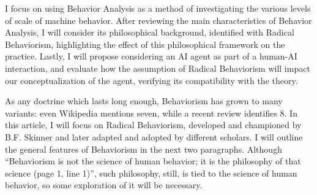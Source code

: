 \documentclass[letterpaper,11pt,twocolumn]{article}
\begin{document}
I focus on using Behavior Analysis as a method of investigating the various levels of scale of machine behavior. After reviewing the main characteristics of Behavior Analysis, I will consider its philosophical background, identified with Radical Behaviorism, highlighting the effect of this philosophical framework on the practice. Lastly, I will propose considering an AI agent as part of a human-AI interaction, and evaluate how the assumption of Radical Behaviorism will impact our conceptualization of the agent, verifying its compatibility with the theory.


As any doctrine which lasts long enough, Behaviorism has grown to many variants: even Wikipedia mentions seven\cite{Behaviorism2023}, while a recent review identifies 8\cite{araibaCurrentDiversificationBehaviorism2020}. In this article, I will focus on Radical Behaviorism, developed and championed by B.F. Skinner and later adapted and adopted by different scholars. I will outline the general features of Behaviorism in the next two paragraphs. Although \enquote{Behaviorism is not the science of human behavior; it is the philosophy of that science (page 1, line 1)}\cite{skinnerBehaviorism1976}, such philosophy, still, is tied to the science of human behavior, so some exploration of it will be necessary.
\end{document}
